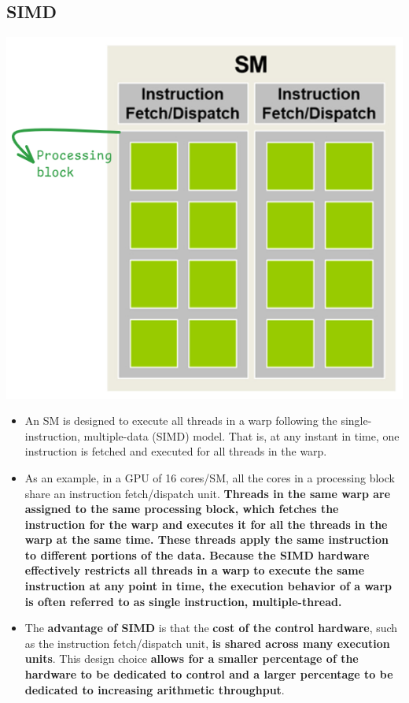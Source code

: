 \subsection{SIMD}
\begin{center}
    \includegraphics[width=0.3\linewidth]{Images/CompArch/SIMD_organization.png}
\end{center}
\begin{itemize}
    \item An SM is designed to execute all threads in a warp following the single-instruction, multiple-data (SIMD) model. That is, at any instant in time, one instruction is fetched and executed for all threads in the warp.
    \item As an example, in a GPU of 16 cores/SM, all the cores in a processing block share an instruction fetch/dispatch unit. \textbf{Threads in the same warp are assigned to the same processing block, which fetches the instruction for the warp and executes it for all the threads in the warp at the same time. These threads apply the same instruction to different portions of the data. Because the SIMD hardware effectively restricts all threads in a warp to execute the same instruction at any point in time, the execution behavior of a warp is often referred to as single instruction, multiple-thread.}
    \item The \textbf{advantage of SIMD} is that the \textbf{cost of the control hardware}, such as the instruction fetch/dispatch unit, \textbf{is shared across many execution units}. This design choice \textbf{allows for a smaller percentage of the hardware to be dedicated to control and a larger percentage to be dedicated to increasing arithmetic throughput}.
\end{itemize}

